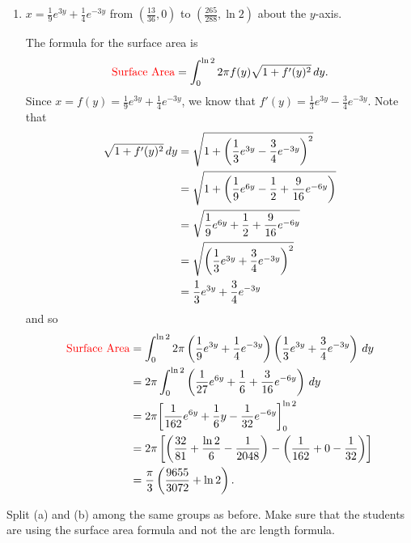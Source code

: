 \documentclass[noinstructornotes]{ximera}
\begin{document}
\begin{problem}
\begin{enumerate}
		\item  $x = \frac{1}{9} e^{3y} + \frac{1}{4} e^{-3y}$ from $\left( \frac{13}{36}, 0 \right)$ to $\left( \frac{265}{288}, \ln 2 \right)$ about the $y$-axis.
		\begin{freeResponse}
		The formula for the surface area is
			\[
			\text{{\color{red} Surface Area}} = \int_0^{\ln 2} 2 \pi f(y) \sqrt{1+f'(y)^2} \,d y.
			\]
		Since $x = f(y) = \frac{1}{9} e^{3y} + \frac{1}{4} e^{-3y}$, 
		we know that $f'(y) = \frac{1}{3} e^{3y} - \frac{3}{4} e^{-3y}$.  
		Note that
			\begin{align*}
			\sqrt{1+f'(y)^2} \,d y  &= \sqrt{1+ \left( \frac{1}{3}e^{3y} - \frac{3}{4}e^{-3y} \right)^2}  \\
			&=  \sqrt{1+ \left( \frac{1}{9}e^{6y} - \frac{1}{2} + \frac{9}{16}e^{-6y} \right)}  \\
			&= \sqrt{ \frac{1}{9}e^{6y} + \frac{1}{2} + \frac{9}{16}e^{-6y} }   \\
			&= \sqrt{ \left( \frac{1}{3}e^{3y} + \frac{3}{4}e^{-3y} \right)^2}  \\
			&= \frac{1}{3}e^{3y} + \frac{3}{4}e^{-3y}
			\end{align*}
		and so
			\begin{align*}
			\text{{\color{red} Surface Area}} &= \int_0^{\ln 2} 2 \pi \left( \frac{1}{9} e^{3y} + \frac{1}{4} e^{-3y} \right) \left( \frac{1}{3}e^{3y} + \frac{3}{4}e^{-3y} \right) \,d y  \\
			&= 2 \pi \int_0^{\ln 2} \left( \frac{1}{27}e^{6y} + \frac{1}{6} + \frac{3}{16}e^{-6y} \right) \,d y  \\
			&= 2 \pi \bigg[ \frac{1}{162}e^{6y} + \frac{1}{6}y - \frac{1}{32}e^{-6y} \bigg]_0^{\ln 2}  \\
			&= 2 \pi \left[ \left( \frac{32}{81} + \frac{\ln 2}{6} - \frac{1}{2048} \right) - \left( \frac{1}{162} + 0 - \frac{1}{32} \right) \right]  \\
			&= \frac{\pi}{3} \left( \frac{9655}{3072} + \ln 2 \right).
			\end{align*}
		\end{freeResponse}
		
	\end{enumerate}
	
\end{problem}

\begin{instructorNotes}
Split (a) and (b) among the same groups as before.  
Make sure that the students are using the surface area formula and not the arc length formula.
\end{instructorNotes}
















	
	
	
	
	
	
	
	
	

	










								
				
				
	
\end{document}
